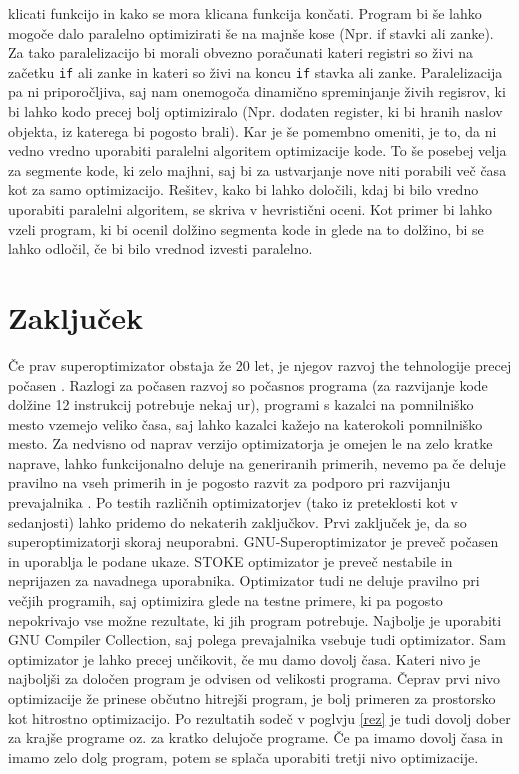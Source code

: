 \documentclass[a4paper, 12pt]{book}
\begin{document}
klicati funkcijo in kako se mora klicana funkcija končati. Program bi še lahko mogoče dalo paralelno optimizirati še na majnše kose (Npr. if stavki ali zanke). Za tako paralelizacijo bi morali obvezno poračunati kateri registri so živi na začetku \texttt{if} ali zanke in kateri so živi na koncu \texttt{if} stavka ali zanke. Paralelizacija pa ni priporočljiva, saj nam onemogoča dinamično spreminjanje živih regisrov, ki bi lahko kodo precej bolj optimiziralo (Npr. dodaten register, ki bi hranih naslov objekta, iz katerega bi pogosto brali). Kar je še pomembno omeniti, je to, da ni vedno vredno uporabiti paralelni algoritem optimizacije kode. To še posebej velja za segmente kode, ki zelo majhni, saj bi za ustvarjanje nove niti porabili več časa kot za samo optimizacijo. Rešitev, kako bi lahko določili, kdaj bi bilo vredno uporabiti paralelni algoritem, se skriva v hevristični oceni. Kot primer bi lahko vzeli program, ki bi ocenil dolžino segmenta kode in glede na to dolžino, bi se lahko odločil, če bi bilo vrednod izvesti paralelno.

\chapter{Zaključek}

Če prav superoptimizator obstaja že 20 let, je njegov razvoj the tehnologije precej počasen \cite{pdf4}. Razlogi za počasen razvoj so počasnos programa (za razvijanje kode dolžine 12 instrukcij potrebuje nekaj ur), programi s kazalci na pomnilniško mesto vzemejo veliko časa, saj lahko kazalci kažejo na katerokoli pomnilniško mesto. Za nedvisno od naprav verzijo optimizatorja je omejen le na zelo kratke naprave, lahko funkcijonalno deluje na generiranih primerih, nevemo pa če deluje pravilno na vseh primerih in je pogosto razvit za podporo pri razvijanju prevajalnika \cite{razlog}. Po testih različnih optimizatorjev (tako iz preteklosti kot v sedanjosti) lahko pridemo do nekaterih zaključkov. Prvi zaključek je, da so superoptimizatorji skoraj neuporabni. GNU-Superoptimizator je preveč počasen in uporablja le podane ukaze. STOKE optimizator je preveč nestabile in neprijazen za navadnega uporabnika. Optimizator tudi ne deluje pravilno pri večjih programih, saj optimizira glede na testne primere, ki pa pogosto nepokrivajo vse možne rezultate, ki jih program potrebuje. Najbolje je uporabiti GNU Compiler Collection, saj polega prevajalnika vsebuje tudi optimizator. Sam optimizator je lahko precej unčikovit, če mu damo dovolj časa. Kateri nivo je najboljši za določen program je odvisen od velikosti programa. Čeprav prvi nivo optimizacije že prinese občutno hitrejši program, je bolj primeren za prostorsko kot hitrostno optimizacijo. Po rezultatih sodeč v poglvju \ref{rez} je tudi dovolj dober za krajše programe oz. za kratko delujoče programe. Če pa imamo dovolj časa in imamo zelo dolg program, potem se splača uporabiti tretji nivo optimizacije.
\ \\
\newpage

\clearpage  
{}


\end{document}
